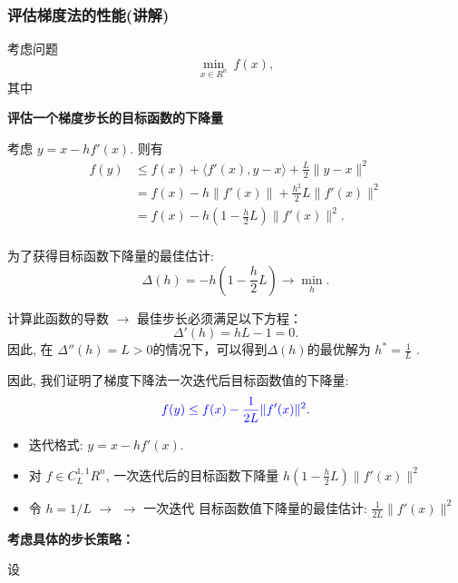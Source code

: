 \documentclass[handout]{beamer}
\begin{document}
\begin{frame}[allowframebreaks]


  \frametitle{评估梯度法的性能(讲解)}

考虑问题
$$
    \min_{x\in R^n} \ f(x),
$$
其中


\bigskip
\textbf{评估一个梯度步长的目标函数的下降量}

\bigskip

考虑 $y = x- h f'(x)$. 则有
\begin{equation}\label{EQ_1_2_12}
\begin{aligned}
    f(y) & \leq f(x) + \langle f'(x), y-x \rangle + \frac{L}{2} \|y-x\|^2 \\
        &  = f(x) -h \| f'(x)\| + \frac{h^2}{2} L \|f'(x)\|^2 \\
        &  = f(x) - h(1-\frac{h}{2}L) \|f'(x)\|^2. \\
\end{aligned}
\end{equation}

\framebreak

为了获得目标函数下降量的最佳估计:
$$
    \Delta(h) = -h(1-\frac{h}{2}L) \longrightarrow \min_{h}^{}.
$$

计算此函数的导数 $\longrightarrow$
最佳步长必须满足以下方程：
$$
    \Delta'(h) = hL - 1 =0.
$$
因此,  在 $\Delta''(h) = L>0$的情况下，可以得到$\Delta(h)$的最优解为 $h^* = \frac{1}{L}$ .

因此, 我们证明了梯度下降法一次迭代后目标函数值的下降量:
$$
   {\color{blue} f(y) \leq f(x) - \frac{1}{2L} \|f'(x)\|^2. }
$$

\framebreak

\begin{itemize}
	\item 
迭代格式:
 $y = x - h f'(x)$.

\item 
对 $f\in C_{L}^{1,1} R^n$, 一次迭代后的目标函数下降量 
 $h(1-\frac{h}{2}L) \|f'(x)\|^2 $ %

\item 
 令 $h = 1/L$ $\rightarrow$ $\rightarrow$
   一次迭代 目标函数值下降量的最佳估计:
 $\frac{1}{2L} \|f'(x)\|^2$ 

\end{itemize}

\framebreak

\bigskip
\textbf{考虑具体的步长策略：}
\bigskip

设 


\end{frame}
\end{document}
